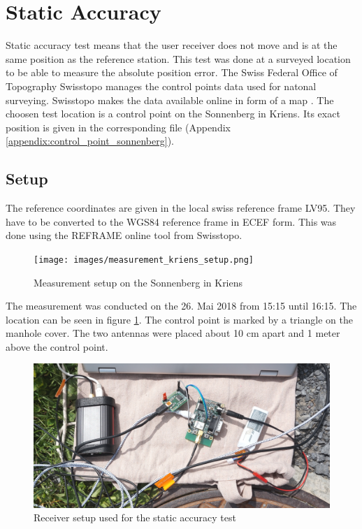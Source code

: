\section{Static Accuracy}\label{sec:static_accuracy}

Static accuracy test means that the user receiver does not move and is at the same position as the reference station.
This test was done at a surveyed location to be able to measure the absolute position error.
The Swiss Federal Office of Topography Swisstopo manages the control points data used for natonal surveying.
Swisstopo makes the data available online in form of a map \cite{Swisstopo}.
The choosen test location is a control point on the Sonnenberg in Kriens.
Its exact position is given in the corresponding file (Appendix \ref{appendix:control_point_sonnenberg}).

\newpage

\subsection{Setup}

The reference coordinates are given in the local swiss reference frame LV95.
They have to be converted to the WGS84 reference frame in ECEF form.
This was done using the REFRAME online tool from Swisstopo.

\begin{figure}[ht]
 \centering
 \texttt{[image: images/measurement\_kriens\_setup.png]}
 \caption{Measurement setup on the Sonnenberg in Kriens}
 \label{fig:measurement_kriens_setup}
\end{figure}

The measurement was conducted on the 26. Mai 2018 from 15:15 until 16:15.
The location can be seen in figure \ref{fig:measurement_kriens_setup}.
The control point is marked by a triangle on the manhole cover.
The two antennas were placed about 10 cm apart and 1 meter above the control point.

\newpage

\begin{figure}[ht]
 \centering
 \includegraphics[width=\textwidth]{images/measurement_kriens_receiver.jpg}
 \caption{Receiver setup used for the static accuracy test}
 \label{fig:measurement_kriens_receiver}
\end{figure}

